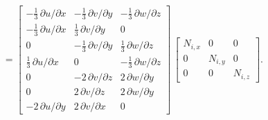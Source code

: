 \begin{equation}
[\mathbf{b}_i] = \begin{bmatrix}
	-\tfrac{1}{3} \, \partial u / \partial x &  - \tfrac{1}{3} \, \partial v / \partial y & -\tfrac{1}{3} \, \partial w / \partial z  \\
	-\tfrac{1}{3} \, \partial u / \partial x &  \tfrac{1}{3} \, \partial v / \partial y & 0  \\
	0  & -\tfrac{1}{3} \, \partial v / \partial y & \tfrac{1}{3} \, \partial w / \partial z \\
	\tfrac{1}{3} \, \partial u / \partial x &  0 & - \tfrac{1}{3} \, \partial w / \partial z  \\
	0 &  - 2 \, \partial v / \partial z &  2 \,  \partial w / \partial y  \\
	0 &  2 \, \partial v / \partial z  & 2 \,  \partial w / \partial y  \\
	- 2 \, \partial u / \partial y &   2 \, \partial v / \partial x & 0   \end{bmatrix}  \, \begin{bmatrix}
N_{i,x} &  0 & 0  \\
0 & N_{i,y} & 0  \\
0 & 0 & N_{i,z} \end{bmatrix}. 
\end{equation}


